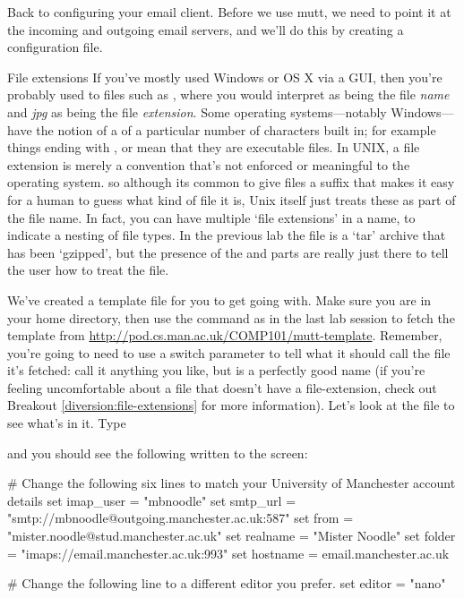 Back to configuring your email client. Before we use mutt, we need to point it at the incoming and outgoing email servers, and we'll do this by creating a configuration file.

\begin{diversion}{File extensions}
\label{diversion:file-extensions}
If you've mostly used Windows or OS X via a GUI, then you're probably used to files such as , where you would interpret  as being the file \textit{name} and \textit{jpg} as being the file \textit{extension}. Some operating systems---notably Windows---have the notion of a  of a particular number of characters built in; for example things ending with ,  or  mean that they are executable files. In UNIX, a file extension is merely a convention that's not enforced or meaningful to the operating system. so although its common to give files a suffix that makes it easy for a human to guess what kind of file it is, Unix itself just treats these as part of the file name. In fact, you can have multiple `file extensions' in a name, to indicate a nesting of file types. In the previous lab the file  is a `tar' archive that has been `gzipped', but the presence of the  and  parts are really just there to tell the user how to treat the file.
\end{diversion}

We've created a template file for you to get going with. Make sure you are in your home directory, then use the  command as in the last lab session to fetch the template from \url{http://pod.cs.man.ac.uk/COMP101/mutt-template}. Remember, you're going to need to use a switch parameter to tell  what it should call the file it's fetched: call it anything you like, but  is a perfectly good name (if you're feeling uncomfortable about a file that doesn't have a file-extension, check out Breakout \ref{diversion:file-extensions} for more information). Let's look at the file to see what's in it. Type


and you should see the following written to the screen:
\begin{ttoutenv}
# Change the following six lines to match your University of Manchester account details
set imap_user = "mbnoodle"
set smtp_url = "smtp://mbnoodle@outgoing.manchester.ac.uk:587"
set from = "mister.noodle@stud.manchester.ac.uk"
set realname = "Mister Noodle"
set folder = "imaps://email.manchester.ac.uk:993"
set hostname = email.manchester.ac.uk

# Change the following line to a different editor you prefer.
set editor = "nano"
\end{ttoutenv}


